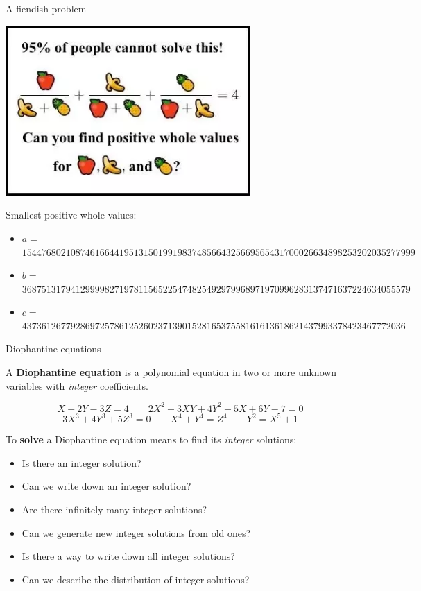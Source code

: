 \documentclass[10pt]{beamer}
\theoremstyle{definition}
\begin{document}
\begin{frame}[t]{A fiendish problem}

\begin{center}
\includegraphics[width=0.7\textwidth]{positive_whole_values.png}
\end{center}

Smallest positive whole values:
\begin{itemize}
\item $ a = $ {\tiny $ 154476802108746166441951315019919837485664325669565431700026634898253202035277999 $}
\item $ b = $ {\tiny $ 36875131794129999827197811565225474825492979968971970996283137471637224634055579 $}
\item $ c = $ {\tiny $ 4373612677928697257861252602371390152816537558161613618621437993378423467772036 $}
\end{itemize}

\end{frame}

\begin{frame}[t]{Diophantine equations}

A \textbf{Diophantine equation} is a polynomial equation in two or more unknown variables with \emph{integer} coefficients.

\begin{examples}
\vspace{-0.3cm}
$$ X - 2Y - 3Z = 4 \qquad 2X^2 - 3XY + 4Y^2 - 5X + 6Y - 7 = 0 $$
$$ 3X^3 + 4Y^3 + 5Z^3 = 0 \qquad X^4 + Y^4 = Z^4 \qquad Y^2 = X^5 + 1 $$
\end{examples}

\vspace{0.5cm} To \textbf{solve} a Diophantine equation means to find its \emph{integer} solutions:
\begin{itemize}
\item Is there an integer solution?
\item Can we write down an integer solution?
\item Are there infinitely many integer solutions?
\item Can we generate new integer solutions from old ones?
\item Is there a way to write down all integer solutions?
\item Can we describe the distribution of integer solutions?
\end{itemize}

\end{frame}
\end{document}
